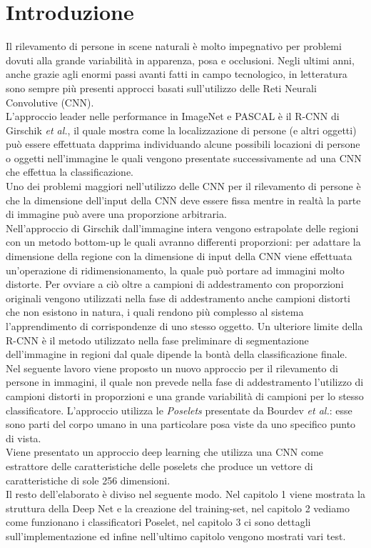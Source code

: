 \chapter*{Introduzione} \label{cap0}
Il rilevamento di persone in scene naturali è molto impegnativo per problemi dovuti alla grande variabilità in apparenza, posa e occlusioni. Negli ultimi anni, anche grazie agli enormi passi avanti fatti in campo tecnologico, in letteratura sono sempre più presenti approcci basati sull'utilizzo delle Reti Neurali Convolutive (CNN). \\
L'approccio leader nelle performance in ImageNet e PASCAL è il R-CNN di Girschik \textit{et al.}\cite{rcnn}, il quale mostra come la localizzazione di persone (e altri oggetti) può essere effettuata dapprima individuando alcune possibili locazioni di persone o oggetti nell'immagine le quali vengono presentate successivamente ad una CNN che effettua la classificazione.\\
Uno dei problemi maggiori nell'utilizzo delle CNN per il rilevamento di persone è che la dimensione dell'input della CNN deve essere fissa mentre in realtà la parte di immagine può avere una proporzione arbitraria.\\
Nell'approccio di Girschik dall'immagine intera vengono estrapolate delle regioni con un metodo bottom-up le quali avranno differenti proporzioni: per adattare la dimensione della regione con la dimensione di input della CNN viene effettuata un'operazione di ridimensionamento, la quale può portare ad immagini molto distorte. Per ovviare a ciò oltre a campioni di addestramento con proporzioni originali vengono utilizzati nella fase di addestramento anche campioni distorti che non esistono in natura, i quali rendono più complesso al sistema l'apprendimento di corrispondenze di uno stesso oggetto. Un ulteriore limite della R-CNN è il metodo utilizzato nella fase preliminare di segmentazione dell'immagine in regioni dal quale dipende la bontà della classificazione finale.\\
Nel seguente lavoro viene proposto un nuovo approccio per il rilevamento di persone in immagini, il quale non prevede nella fase di addestramento l'utilizzo di campioni distorti in proporzioni e una grande variabilità di campioni per lo stesso classificatore. L'approccio utilizza le \textit{Poselets} presentate da Bourdev \textit{et al.}\cite{poselets}: esse sono parti del corpo umano in una particolare posa viste da uno specifico punto di vista. \\
Viene presentato un approccio deep learning che utilizza una CNN come estrattore delle caratteristiche delle poselets che produce un vettore di caratteristiche di sole 256 dimensioni.\\
Il resto dell'elaborato è diviso nel seguente modo. Nel capitolo 1 viene mostrata la struttura della Deep Net e la creazione del training-set, nel capitolo 2 vediamo come funzionano i classificatori Poselet, nel capitolo 3 ci sono dettagli sull'implementazione ed infine nell'ultimo capitolo vengono mostrati vari test.



